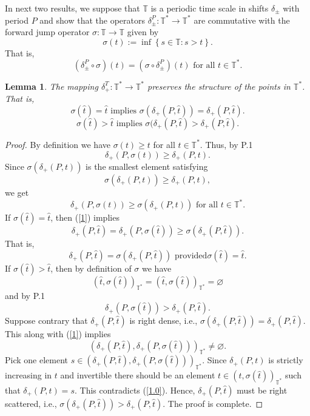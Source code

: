 \documentclass[b5paper,reqno]{amsart}\usepackage{amsfonts}
\theoremstyle{plain}
\newtheorem{lemma}{Lemma}
\numberwithin{equation}{section}
\begin{document}
In next two results, we suppose that $\mathbb{T}$ is a periodic time scale in
shifts $\delta_{\pm}$ with period $P$ and show that the operators $\delta
_{\pm}^{P}:\mathbb{T}^{\ast}\rightarrow\mathbb{T}^{\ast}$ are commutative with
the forward jump operator $\sigma:\mathbb{T\rightarrow T}$ given by
\[
\sigma(t):=\inf\left\{  s\in\mathbb{T}:s>t\right\}  .
\]
That is,\begin{equation}
\left(  \delta_{\pm}^{P}\circ\sigma\right)  (t)=\left(  \sigma\circ\delta
_{\pm}^{P}\right)  (t)\text{ for all }t\in\mathbb{T}^{\ast}.
\label{commutativity}\end{equation}

\begin{lemma}
The mapping $\delta_{+}^{T}:\mathbb{T}^{\ast}\rightarrow\mathbb{T}^{\ast}$
preserves the structure of the points in $\mathbb{T}^{\ast}$. That is,\[
\sigma(\widehat{t})=\widehat{t}\text{ implies }\sigma(\delta_{+}(P,\widehat
{t}))=\delta_{+}(P,\widehat{t}).
\]\[
\sigma(\widehat{t})>\widehat{t}\text{ implies }\sigma(\delta_{+}(P,\widehat
{t})>\delta_{+}(P,\widehat{t}).
\]

\end{lemma}

\begin{proof}
By definition we have $\sigma(t)\geq t$ for all $t\in\mathbb{T}^{\ast}$. Thus,
by P.1\[
\delta_{+}(P,\sigma(t))\geq\delta_{+}(P,t).
\]
Since $\sigma(\delta_{+}(P,t))$ is the smallest element satisfying\[
\sigma(\delta_{+}(P,t))\geq\delta_{+}(P,t),
\]
we get\begin{equation}
\delta_{+}(P,\sigma(t))\geq\sigma(\delta_{+}(P,t))\text{ for all }t\in\mathbb{T}^{\ast}\text{.} \label{1}\end{equation}
If $\sigma(\widehat{t})=\widehat{t}$, then (\ref{1}) implies\[
\delta_{+}(P,\widehat{t})=\delta_{+}(P,\sigma(\widehat{t}))\geq\sigma
(\delta_{+}(P,\widehat{t})).
\]
That is,\[
\delta_{+}(P,\widehat{t})=\sigma(\delta_{+}(P,\widehat{t}))\text{ provided
}\sigma(\widehat{t})=\widehat{t}\text{.}\]
If $\sigma(\widehat{t})>\widehat{t}$, then by definition of $\sigma$ we have\begin{equation}
(\widehat{t},\sigma(\widehat{t}))_{\mathbb{T}^{\ast}}=(\widehat{t},\sigma(\widehat{t}))_{\mathbb{T}^{\ast}}=\varnothing\label{1.0}\end{equation}
and by P.1\[
\delta_{+}(P,\sigma(\widehat{t}))>\delta_{+}(P,\widehat{t}).
\]
Suppose contrary that $\delta_{+}(P,\widehat{t})$ is right dense, i.e.,
$\sigma(\delta_{+}(P,\widehat{t}))=\delta_{+}(P,\widehat{t})$. This along with
(\ref{1}) implies\[
(\delta_{+}(P,\widehat{t}),\delta_{+}(P,\sigma(\widehat{t})))_{\mathbb{T}^{\ast}}\neq\varnothing\text{.}\]
Pick one element $s\in(\delta_{+}(P,\widehat{t}),\delta_{+}(P,\sigma
(\widehat{t})))_{\mathbb{T}^{\ast}}$. Since $\delta_{+}(P,t)$ is strictly
increasing in $t$ and invertible there should be an element $t\in(\widehat
{t},\sigma(\widehat{t}))_{\mathbb{T}^{\ast}}$ such that $\delta_{+}(P,t)=s$.
This contradicts (\ref{1.0}). Hence, $\delta_{+}(P,\widehat{t})$ must be right
scattered, i.e., $\sigma(\delta_{+}(P,\widehat{t}))>\delta_{+}(P,\widehat{t})$. The proof is complete.
\end{proof}
\end{document}
